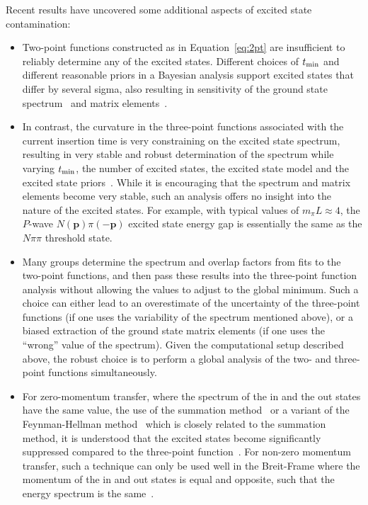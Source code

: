 \documentclass{ar-1col}
\def\tmin{t_{\rm min}}
\begin{document}
Recent results have uncovered some additional aspects of excited state contamination:
\begin{itemize}[leftmargin=*]
\item Two-point functions constructed as in Equation~\eqref{eq:2pt} are insufficient to reliably determine any of the excited states.  Different choices of $\tmin$ and different reasonable priors in a Bayesian analysis support excited states that differ by several sigma, also resulting in sensitivity of the ground state spectrum~\cite{Park:2021ypf,He:2021yvm} and matrix elements~\cite{Jang:2019vkm,Gupta:2021ahb}.

\item In contrast, the curvature in the three-point functions associated with the current insertion time is very constraining on the excited state spectrum, resulting in very stable and robust determination of the spectrum while varying $\tmin$, the number of excited states, the excited state model and the excited state priors~\cite{He:2021yvm}.
While it is encouraging that the spectrum and matrix elements become very stable, such an analysis offers no insight into the nature of the excited states.  For example, with typical values of $m_\pi L\approx4$, the $P$-wave $N(\mathbf{p})\pi(-\mathbf{p})$ excited state energy gap is essentially the same as the $N\pi\pi$ threshold state.%
\begin{marginnote}
\end{marginnote}

\item Many groups determine the spectrum and overlap factors from fits to the two-point functions, and then pass these results into the three-point function analysis without allowing the values to adjust to the global minimum.  Such a choice can either lead to an overestimate of the uncertainty of the three-point functions (if one uses the variability of the spectrum mentioned above), or a biased extraction of the ground state matrix elements (if one uses the ``wrong'' value of the spectrum).  Given the computational setup described above, the robust choice is to perform a global analysis of the two- and three-point functions simultaneously.

\item For zero-momentum transfer, where the spectrum of the in and the out states have the same value,
the use of the summation method~\cite{Maiani:1987by} or a variant of the Feynman-Hellman method~\cite{deDivitiis:2012vs,Bouchard:2016heu} which is closely related to the summation method, it is understood that the excited states become significantly suppressed compared to the three-point function~\cite{Capitani:2012gj,He:2021yvm}.
For non-zero momentum transfer, such a technique can only be used well in the Breit-Frame where the momentum of the in and out states is equal and opposite, such that the energy spectrum is the same~\cite{Gambhir:2019pvw}.


\end{itemize}
\end{document}
